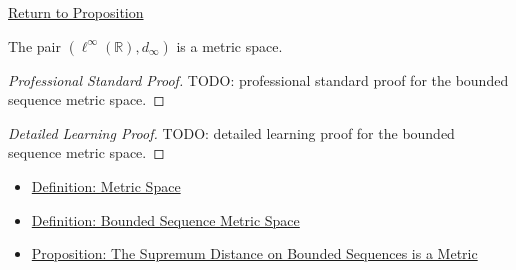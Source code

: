 \newpage
{}
\label{prf:bounded-sequence-metric-space}

\begin{remark*}[Return]
\hyperref[prop:bounded-sequence-metric-space]{Return to Proposition}
\end{remark*}

\begin{proposition*}
The pair \((\ell^\infty(\mathbb{R}),d_\infty)\) is a metric space.
\end{proposition*}

\begin{proof}[Professional Standard Proof]
\LRAProofBodyStart
TODO: professional standard proof for the bounded sequence metric space.
\end{proof}

\begin{proof}[Detailed Learning Proof]
\LRAProofBodyStart
TODO: detailed learning proof for the bounded sequence metric space.
\end{proof}

\begin{remark*}
\end{remark*}

\begin{dependencies}
\begin{itemize}
  \item \hyperref[def:metric-space]{Definition: Metric Space}
  \item \hyperref[def:bounded-sequence-metric-space]{Definition: Bounded Sequence Metric Space}
  \item \hyperref[prop:bounded-real-sequence-space-sup-metric]{Proposition: The Supremum Distance on Bounded Sequences is a Metric}
\end{itemize}
\end{dependencies}

\clearpage

